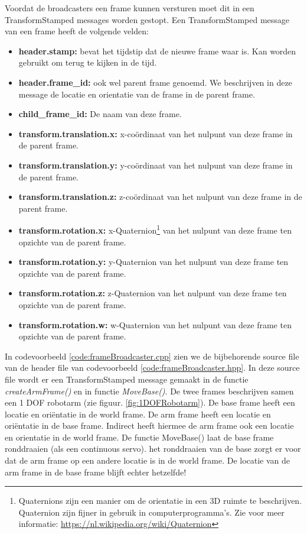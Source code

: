\noindent Voordat de broadcasters een frame kunnen versturen moet dit in een TransformStamped messages worden gestopt. Een TransformStamped message van een frame heeft de volgende velden:
\begin{itemize}
    \item \textbf{header.stamp:} bevat het tijdstip dat de nieuwe frame waar is. Kan worden gebruikt om terug te kijken in de tijd.
    \item \textbf{header.frame\_id:} ook wel parent frame genoemd. We beschrijven in deze message de locatie en orientatie van de frame in de parent frame.
    \item \textbf{child\_frame\_id:} De naam van deze frame.
    \item \textbf{transform.translation.x:} x-coördinaat van het nulpunt van deze frame in de parent frame.
    \item \textbf{transform.translation.y:} y-coördinaat van het nulpunt van deze frame in de parent frame.
    \item \textbf{transform.translation.z:} z-coördinaat van het nulpunt van deze frame in de parent frame.
    \item\textbf{ transform.rotation.x:} x-Quaternion\footnote{Quaternions zijn een manier om de orientatie in een 3D ruimte te beschrijven. Quaternion zijn fijner in gebruik in computerprogramma's. Zie voor meer informatie: \url{https://nl.wikipedia.org/wiki/Quaternion}} van het nulpunt van deze frame ten opzichte van de parent frame.
    \item \textbf{transform.rotation.y:} y-Quaternion van het nulpunt van deze frame ten opzichte van de parent frame.
    \item \textbf{transform.rotation.z:} z-Quaternion van het nulpunt van deze frame ten opzichte van de parent frame.
    \item \textbf{transform.rotation.w:} w-Quaternion van het nulpunt van deze frame ten opzichte van de parent frame.
\end{itemize}
\noindent In codevoorbeeld \ref{code:frameBroadcaster.cpp} zien we de bijbehorende source file van de header file van codevoorbeeld \ref{code:frameBroadcaster.hpp}. In deze source file wordt er een TransformStamped message gemaakt in de functie \textit{createArmFrame()} en in functie \textit{MoveBase()}. De twee frames beschrijven samen een 1 DOF robotarm (zie figuur. \ref{fig:1DOFRobotarm}). De base frame heeft een locatie en oriëntatie in de world frame. De arm frame heeft een locatie en oriëntatie in de base frame. Indirect heeft hiermee de arm frame ook een locatie en orientatie in de world frame. De functie MoveBase() laat de base frame ronddraaien (als een continuous servo). het ronddraaien van de base zorgt er voor dat de arm frame op een andere locatie is in de world frame. De locatie van de arm frame in de base frame blijft echter hetzelfde!

